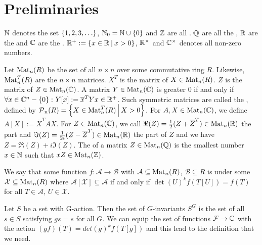 

\section{Preliminaries}

$\mathbb{N}$ denotes the set $\Set{1,2,3,\dots}$, $\N_0 = \N \cup \Set{0}$ and $\mathbb{Z}$ are all . $\mathbb{Q}$ are all the , $\mathbb{R}$ are the  and $\mathbb{C}$ are the . $\R^+ := \Set{x\in\R}{x>0}$, $\mathbb{R}^\times$ and $\mathbb{C}^\times$ denotes all non-zero numbers.

Let $\operatorname{Mat}_n(R)$ be the set of all $n \times n$  over some commutative ring $R$.
Likewise, $\operatorname{Mat}_n^T(R)$ are the  $n \times n$ matrices.
$X^T$ is the  matrix of $X \in \operatorname{Mat}_n(R)$.
$\overline{Z}$ is the  matrix of $Z \in \operatorname{Mat}_n(\mathbb{C})$.
A matrix $Y \in \operatorname{Mat}_n(\mathbb{C})$ is greater $0$ if and only if $\forall x \in \C^n - \Set{0} \colon Y[x] := \overline{x}^{T} Y x \in \R^+$. Such symmetric matrices are called the , defined by $\PM_n(R) = \Set{X \in \M^T_n(R)}{X > 0}$. For $A,X \in \operatorname{Mat}_n(\mathbb{C})$, we define $A[X] := \overline{X}^T A X$. For $Z \in \operatorname{Mat}_n(\mathbb{C})$, we call $\Re(Z) = \frac{1}{2} (Z + \overline{Z}^{T}) \in \operatorname{Mat}_n(\mathbb{R})$ the  part and $\Im(Z) = \frac{1}{2i} (Z - \overline{Z}^{T})  \in \operatorname{Mat}_n(\mathbb{R})$ the  part of $Z$ and we have $Z = \Re(Z) + i \Im(Z)$. The  of a matrix $Z \in \operatorname{Mat}_n(\mathbb{Q})$ is the smallest number $x \in \mathbb{N}$ such that $x Z \in \operatorname{Mat}_n(\mathbb{Z})$.

We say that some function $f \colon \mathcal{A} \rightarrow \mathcal{B}$ with $\mathcal{A} \subseteq \operatorname{Mat}_n(R)$, $\mathcal{B} \subseteq R$ is  under some $\mathcal{X} \subseteq \operatorname{Mat}_n(R)$ where $\mathcal{A}[\mathcal{X}] \subseteq \mathcal{A}$ if and only if $\det(U)^k f(T[U]) = f(T)$ for all $T \in \mathcal{A}$, $U \in \mathcal{X}$.

Let $S$ be a set with G-action. Then the set of $G$-invariants $S^G$ is the set of all $s \in S$ satisfying $g s = s$ for all $G$.  We can equip the set of functions $\mathcal{F} \rightarrow \mathbb{C}$ with the action
$( g f ) (T) = det(g)^k f( T[g] )$  %
and this lead to the definition that we need.

